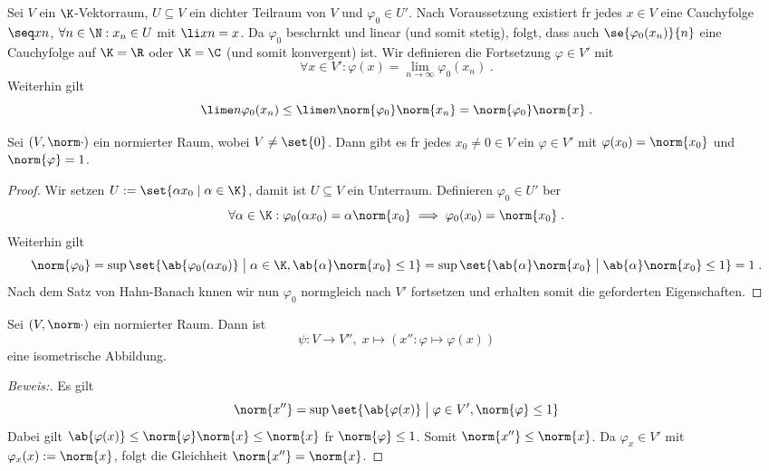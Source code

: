 	\begin{ex}
		Sei $V$ ein $\K$-Vektorraum, \(U\subseteq V\) ein dichter Teilraum von $V$ und \(\varphi_0\in U'\). Nach Voraussetzung existiert f\us r jedes \(x\in V\) eine Cauchyfolge  \(\seq xn\), \(\forall n\in \N: x_n \in U\) mit \(\li xn = x\). Da $\varphi_0$ beschr\as nkt und linear (und somit stetig), folgt, dass auch \(\se{\varphi_0(x_n)}{n}\) eine Cauchyfolge auf  \(\K = \R\) oder \(\K = \C\) (und somit konvergent) ist. Wir definieren die  Fortsetzung \(\varphi \in V'\) mit
		\[\forall x\in V' : \varphi(x) = \lim_{n\to\infty} \varphi_0(x_n)\;.\]
		Weiterhin gilt
		\[\lime n \varphi_0(x_n) \leq \lime n\norm{\varphi_0} \norm{x_n} = \norm{\varphi_0}\norm{x}\;. \]
		
	\end{ex} 
	
	\begin{theorem}
		Sei \((V,\norm\cdot)\) ein normierter Raum, wobei \(V \neq \set{0}\). Dann gibt es f\us r jedes \(x_0\neq 0 \in V\) ein \(\varphi \in V'\) mit \(\varphi(x_0) = \norm{x_0}\) und \(\norm{\varphi} = 1\).
	\end{theorem}
	\begin{proof}
		Wir setzen \(U:=\set{\alpha x_0\;\vert\; \alpha \in \K}\), damit ist \(U\subseteq V\) ein Unterraum. Definieren \(\varphi_0\in U'\) \us ber 
		\[\forall \alpha \in \K: \varphi_0(\alpha x_0) = \alpha \norm{x_0} \implies \varphi_0(x_0) = \norm{x_0}\;.\]
		Weiterhin gilt
		\[\norm{\varphi_0} = \sup \set{\ab{\varphi_0(\alpha x_0)} \;\big\vert\; \alpha \in \K, \ab{\alpha}\norm{x_0} \leq 1} = \sup \set{\ab{\alpha} \norm{x_0} \;\big\vert\; \ab{\alpha}\norm{x_0} \leq 1} = 1\;.\]
		Nach dem Satz von Hahn-Banach k\os nnen wir nun \(\varphi_0\) normgleich nach \(V'\) fortsetzen und erhalten somit die geforderten Eigenschaften.
	\end{proof}	
	
	\begin{theorem}
		\label{Doppeldual_1} Sei \((V,\norm\cdot)\) ein normierter Raum. Dann ist 
		\[\psi: V \to V'',\; x \mapsto (x'':\varphi \mapsto \varphi(x))\]
		eine isometrische Abbildung.
	\end{theorem}
	\begin{proof}[Beweis:]
		Es gilt 
		\[\norm{x''} = \sup\set{\ab{\varphi(x)} \;\big\vert\;\varphi\in V', \norm{\varphi} \leq 1} \]
		Dabei gilt \(\ab{\varphi(x)} \leq \norm{\varphi}\norm{x} \leq \norm{x}\) f\us r \(\norm{\varphi}\leq 1\). Somit \(\norm{x''} \leq \norm{x}\). Da \(\varphi_x \in V'\) mit \(\varphi_x(x):= \norm{x}\), folgt die Gleichheit \(\norm{x''} = \norm{x}\).
			
	\end{proof}
	
